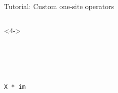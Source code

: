 \begin{frame}[fragile]{Tutorial: Custom one-site operators}
\begin{columns}
\begin{column}{4.5cm}
\begin{onlyenv}<4->
~\\
~\\
~\\
~\\
~\\
\begin{lstlisting}[language=JuliaLocal, style=julia, basicstyle=\scriptsize\ttfamily]
X * im
\end{lstlisting}
\end{onlyenv}

\end{column}

\end{columns}

\end{frame}
